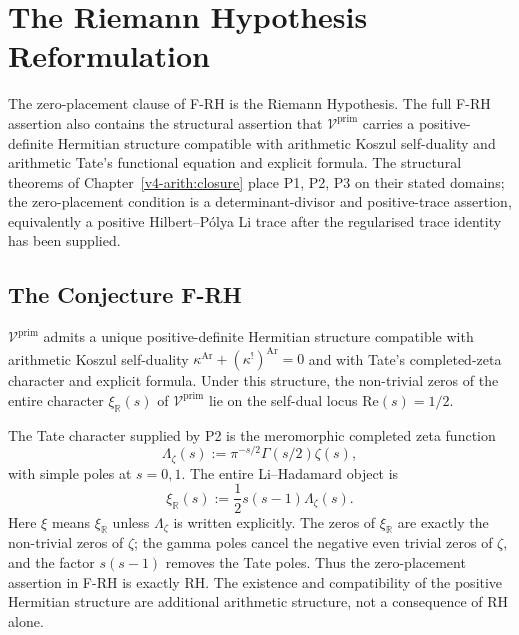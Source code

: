 \chapter{The Riemann Hypothesis Reformulation}
\label{v4-arith:rh-reformulation}

The zero-placement clause of F-RH is the Riemann Hypothesis.  The full
F-RH assertion also contains the structural assertion that
\(\mathcal{V}^{\mathrm{prim}}\) carries a positive-definite Hermitian
structure compatible with arithmetic Koszul self-duality and arithmetic
Tate's functional equation and explicit formula. The structural theorems of
Chapter~\ref{v4-arith:closure} place P1, P2, P3 on their stated domains; the
zero-placement condition is a determinant-divisor and positive-trace
assertion, equivalently a positive Hilbert--P\'olya Li trace after the
regularised trace identity has been supplied.

\section{The Conjecture F-RH}
\label{v4-arith:rh:F-RH-statement}

\begin{conjecture}
\label{v4-arith:conj:F-RH}
\(\mathcal{V}^{\mathrm{prim}}\) admits a unique positive-definite
Hermitian structure compatible with arithmetic Koszul self-duality
\(\kappa^{\mathrm{Ar}}+(\kappa^{!})^{\mathrm{Ar}}=0\) and with
Tate's completed-zeta character and explicit formula. Under this structure, the non-trivial
zeros of the entire character \(\xi_{\mathbb R}(s)\) of
\(\mathcal{V}^{\mathrm{prim}}\) lie on the self-dual locus
\(\mathrm{Re}(s)=1/2\).
\end{conjecture}

\begin{remark}
\label{v4-arith:rh:rem:equivalence-to-RH}
The Tate character supplied by P2 is the meromorphic completed zeta
function
\[
\Lambda_{\zeta}(s):=\pi^{-s/2}\Gamma(s/2)\zeta(s),
\]
with simple poles at \(s=0,1\). The entire Li--Hadamard object is
\[
\xi_{\mathbb R}(s):=\frac12s(s-1)\Lambda_{\zeta}(s).
\]
Here \(\xi\) means \(\xi_{\mathbb R}\) unless
\(\Lambda_{\zeta}\) is written explicitly. The zeros of
\(\xi_{\mathbb R}\) are exactly the non-trivial zeros of \(\zeta\);
the gamma poles cancel the negative even trivial zeros of
\(\zeta\), and the factor \(s(s-1)\) removes the Tate poles.
Thus the zero-placement assertion in F-RH is exactly RH.  The
existence and compatibility of the positive Hermitian structure are
additional arithmetic structure, not a consequence of RH alone.
\end{remark}

